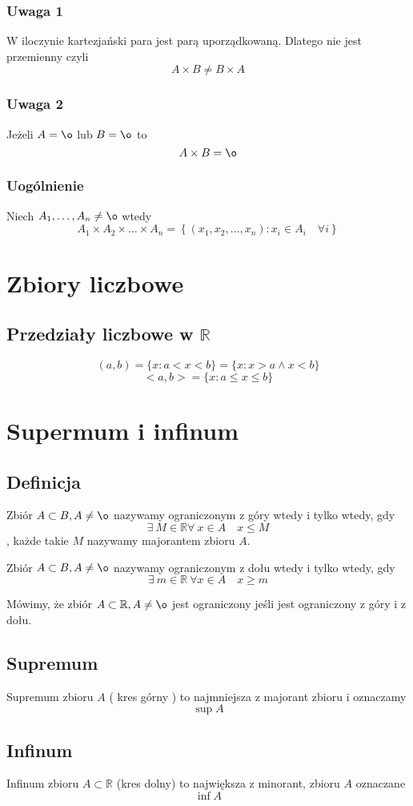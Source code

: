 \documentclass[11pt]{article}
\begin{document}
\subsubsection{Uwaga 1}
W iloczynie kartezjański para jest parą uporządkowaną. Dlatego nie jest przemienny czyli
$$ A \times B  \not = B \times A $$
\subsubsection{Uwaga 2}
Jeżeli $A = \o$ lub $B = \o$ to $$ A \times B = \o$$
\subsubsection{Uogólnienie}
Niech $A_1,\ldots,A_n \not = \o$ wtedy
$$ A_1 \times A_2 \times \ldots \times A_n = \left\{ (x_1,x_2,\ldots,x_n): x_i \in A_i \quad \forall i \right\} $$ 

\section{Zbiory liczbowe}
\subsection{Przedziały liczbowe w $\mathbb{R}$}
$$ (a,b) = \{ x : a < x < b \} = \{ x : x > a \wedge x < b \} $$
$$ <a,b> = \{ x : a \leq x \leq b \} $$

\section{Supermum i infinum}
\subsection{Definicja}
Zbiór $A \subset B, A \not = \o$ nazywamy ograniczonym z góry wtedy i tylko wtedy, gdy $$ \exists\ M \in \mathbb{R} \forall\ x \in A \quad x \leq M$$, każde takie $M$ nazywamy majorantem zbioru $A$.

Zbiór $A \subset B, A \not = \o$ nazywamy ograniczonym z dołu wtedy i tylko wtedy, gdy $$ \exists\ m \in \mathbb{R}\ \forall x \in A \quad x \geq m$$

Mówimy, że zbiór $A \subset \mathbb{R}, A \not = \o$ jest ograniczony jeśli jest ograniczony z góry i z dołu. 

\subsection{Supremum}
Supremum zbioru $A$ ( kres górny ) to najmniejsza z majorant zbioru i oznaczamy 
$$ \sup A$$
\subsection{Infinum}
Infinum zbioru $A \subset \mathbb{R}$ (kres dolny) to największa z minorant, zbioru $A$ oznaczane $$ \inf A$$
\end{document}
